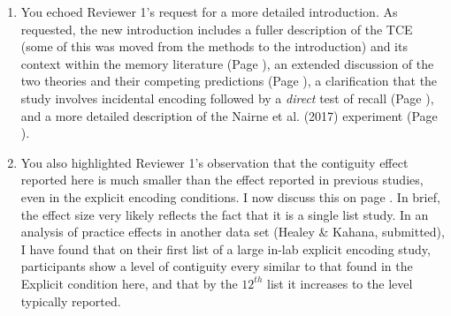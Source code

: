 \documentclass[12pt]{article}
\begin{document}
\begin{enumerate}

\item
	You echoed Reviewer 1's request for a more detailed introduction. As requested, the new introduction includes a fuller description of the TCE (some of this was moved from the methods to the introduction) and its context within the memory literature (Page \pageref{TODO-1}), %
	an extended discussion of the two theories and their competing predictions (Page \pageref{TODO-2}),
	a clarification that the study involves incidental encoding followed by a \emph{direct} test of recall (Page  \pageref{TODO-3}),
	and a more detailed description of the Nairne et al. (2017) experiment (Page \pageref{TODO-4}).

\item
	You also highlighted Reviewer 1's observation that the contiguity effect reported here is much smaller than the effect reported in previous studies, even in the explicit encoding conditions. I now discuss this on page \pageref{TODO-5}. In brief, the effect size very likely reflects the fact that it is a single list study. In an analysis of practice effects in another data set (Healey \& Kahana, submitted), I have found that on their first list of a large in-lab explicit encoding study, participants show a level of contiguity every similar to that found in the Explicit condition here, and that by the $12^{th}$ list it increases to the level typically reported. 


\end{enumerate}
\end{document}
